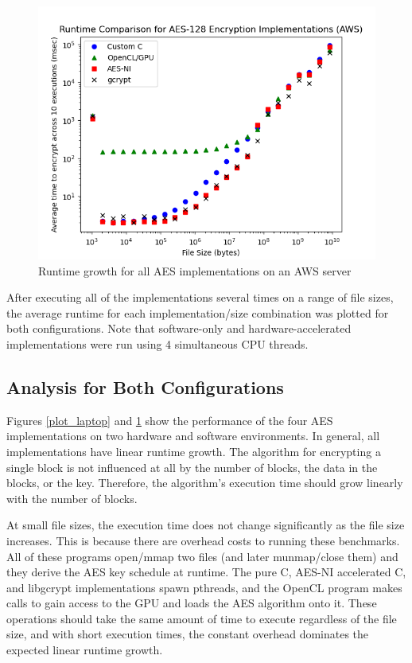 \documentclass[a4paper,10pt]{article}
\begin{document}
\begin{figure}[H]
 \begin{center}
  \includegraphics[width=\textwidth]{results_aws.png}
  \caption{Runtime growth for all AES implementations on an AWS server}
  \label{plot_aws}
 \end{center}
\end{figure}

After executing all of the implementations several times on a range of file sizes, the average runtime for each implementation/size combination was plotted for both configurations.  Note that software-only and hardware-accelerated implementations were run using 4 simultaneous CPU threads.

\subsection{Analysis for Both Configurations}


Figures \ref{plot_laptop} and \ref{plot_aws} show the performance of the four AES implementations on two hardware and software environments. In general, all implementations have linear runtime growth.  The algorithm for encrypting a single block is not influenced at all by the number of blocks, the data in the blocks, or the key.  Therefore, the algorithm's execution time should grow linearly with the number of blocks.

At small file sizes, the execution time does not change significantly as the file size increases.  This is because there are overhead costs to running these benchmarks.  All of these programs open/mmap two files (and later munmap/close them) and they derive the AES key schedule at runtime.  The pure C, AES-NI accelerated C, and libgcrypt implementations spawn pthreads, and the OpenCL program makes calls to gain access to the GPU and loads the AES algorithm onto it.  These operations should take the same amount of time to execute regardless of the file size, and with short execution times, the constant overhead dominates the expected linear runtime growth.
\end{document}
